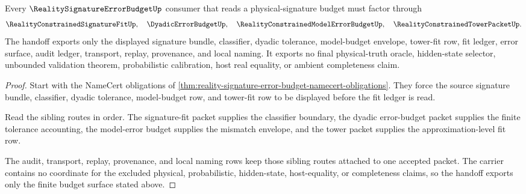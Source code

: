 \begin{theorem}
\label{thm:reality-signature-error-budget-tower-fit-handoff}
Every $\RealitySignatureErrorBudgetUp$ consumer that reads a physical-signature budget must factor through
$$
\RealityConstrainedSignatureFitUp,\quad \DyadicErrorBudgetUp,\quad \RealityConstrainedModelErrorBudgetUp,\quad \RealityConstrainedTowerPacketUp .
$$
The handoff exports only the displayed signature bundle, classifier, dyadic tolerance, model-budget envelope, tower-fit row, fit ledger, error surface, audit ledger, transport, replay, provenance, and local naming. It exports no final physical-truth oracle, hidden-state selector, unbounded validation theorem, probabilistic calibration, host real equality, or ambient completeness claim.
\end{theorem}
\begin{proof}
Start with the NameCert obligations of \autoref{thm:reality-signature-error-budget-namecert-obligations}. They force the source signature bundle, classifier, dyadic tolerance, model-budget row, and tower-fit row to be displayed before the fit ledger is read.

Read the sibling routes in order. The signature-fit packet supplies the classifier boundary, the dyadic error-budget packet supplies the finite tolerance accounting, the model-error budget supplies the mismatch envelope, and the tower packet supplies the approximation-level fit row.

The audit, transport, replay, provenance, and local naming rows keep those sibling routes attached to one accepted packet. The carrier contains no coordinate for the excluded physical, probabilistic, hidden-state, host-equality, or completeness claims, so the handoff exports only the finite budget surface stated above.
\end{proof}


